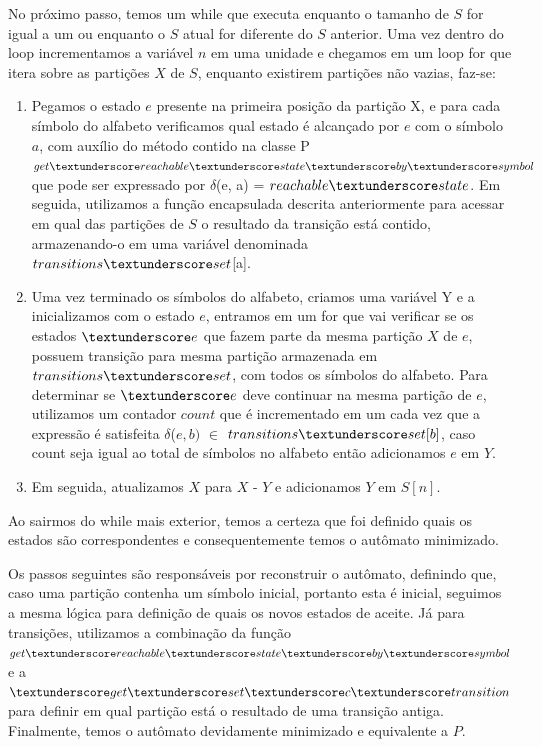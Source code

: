 \documentclass[12pt]{article}
\begin{document}
No próximo passo, temos um while que executa enquanto o tamanho de $S$ for igual a um ou 
enquanto o $S$ atual for diferente do $S$ anterior. Uma vez dentro do loop incrementamos a 
variável $n$ em uma unidade e chegamos em um loop for que itera sobre as partições $X$ de $S$, 
enquanto existirem partições não vazias, faz-se: 
\begin{enumerate}
    \item Pegamos o estado $e$ presente na primeira posição da partição X, e para cada símbolo do alfabeto verificamos qual estado é alcançado por $e$ com o símbolo $a$, com auxílio do método contido na classe P $get\textunderscore reachable\textunderscore state\textunderscore by\textunderscore symbol$ que pode ser expressado por $\delta$(e, a) = $reachable\textunderscore state$. Em seguida, utilizamos a função encapsulada descrita anteriormente para acessar em qual das partições de $S$ o resultado da transição está contido, armazenando-o em uma variável denominada $transitions\textunderscore set$[a]. 
    \item Uma vez terminado os símbolos do alfabeto, criamos uma variável Y e a inicializamos com o estado $e$, entramos em um for que vai verificar se os estados $\textunderscore e$ que fazem parte da mesma partição $X$ de $e$, possuem transição para mesma partição armazenada em $transitions\textunderscore set$, com todos os símbolos do alfabeto. Para determinar se $\textunderscore e$ deve continuar na mesma partição de $e$, utilizamos um contador $count$ que é incrementado em um cada vez que a expressão é satisfeita $\delta$(\textunderscore $e, b)$ $\in$ $transitions\textunderscore set[b]$, caso count seja igual ao total de símbolos no alfabeto então adicionamos \textunderscore $e$ em $Y$.
    \item Em seguida, atualizamos $X$ para $X$ - $Y$ e adicionamos $Y$ em $S[n]$.
\end{enumerate}

Ao sairmos do while mais exterior, temos a certeza que foi definido quais os estados 
são correspondentes e consequentemente temos o autômato minimizado. 

Os passos seguintes são responsáveis por reconstruir o autômato, definindo que, caso uma partição contenha um símbolo inicial, portanto esta é inicial, seguimos a mesma lógica para definição de quais os novos estados de aceite. Já para transições, utilizamos a combinação da função 
$get\textunderscore reachable\textunderscore state\textunderscore by\textunderscore symbol$ e a $\textunderscore get\textunderscore set\textunderscore c\textunderscore transition$ para definir em qual partição 
está o resultado de uma transição antiga. Finalmente, temos o autômato devidamente 
minimizado e equivalente a $P$. 
\end{document}
